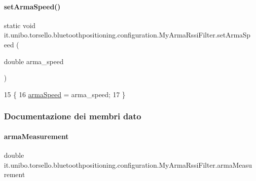 \paragraph{\texorpdfstring{set\+Arma\+Speed()}{setArmaSpeed()}}
{\footnotesize\ttfamily static void it.\+unibo.\+torsello.\+bluetoothpositioning.\+configuration.\+My\+Arma\+Rssi\+Filter.\+set\+Arma\+Speed (\begin{DoxyParamCaption}\item[{double}]{arma\+\_\+speed }\end{DoxyParamCaption})\hspace{0.3cm}{\ttfamily [static]}}


\begin{DoxyCode}
15                                                        \{
16         \hyperlink{classit_1_1unibo_1_1torsello_1_1bluetoothpositioning_1_1configuration_1_1MyArmaRssiFilter_a5332b55e26b28536d1f8c7cae5e684b4_a5332b55e26b28536d1f8c7cae5e684b4}{armaSpeed} = arma\_speed;
17     \}
\end{DoxyCode}


\subsubsection{Documentazione dei membri dato}
\hypertarget{classit_1_1unibo_1_1torsello_1_1bluetoothpositioning_1_1configuration_1_1MyArmaRssiFilter_a2be11d7395143321b8f2063afe14a8d0_a2be11d7395143321b8f2063afe14a8d0}{}\label{classit_1_1unibo_1_1torsello_1_1bluetoothpositioning_1_1configuration_1_1MyArmaRssiFilter_a2be11d7395143321b8f2063afe14a8d0_a2be11d7395143321b8f2063afe14a8d0} 
\paragraph{\texorpdfstring{arma\+Measurement}{armaMeasurement}}
{\footnotesize\ttfamily double it.\+unibo.\+torsello.\+bluetoothpositioning.\+configuration.\+My\+Arma\+Rssi\+Filter.\+arma\+Measurement\hspace{0.3cm}{\ttfamily [private]}}

